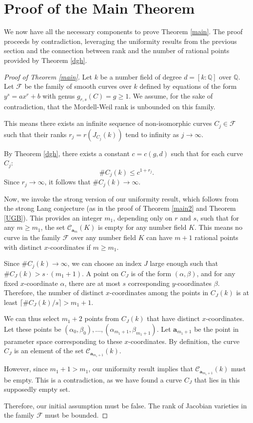 \documentclass[11pt, a4paper]{amsart}
\theoremstyle{definition}
\newcommand{\Q}{\mathbb{Q}}
\newcommand{\Cc}{\mathcal{C}}
\newcommand{\ba}{\mathbf{a}}
\begin{document}
\section{Proof of the Main Theorem}
\label{proof-main-thm}
We now have all the necessary components to prove Theorem \ref{main}. The proof proceeds by contradiction, leveraging the uniformity results from the previous section and the connection between rank and the number of rational points provided by Theorem \ref{dgh}.

\begin{proof}[Proof of Theorem \ref{main}]
	Let $k$ be a number field of degree $d=[k:\Q]$ over $\Q$. Let $\mathcal{F}$ be the family of smooth curves over $k$ defined by equations of the form $y^s=ax^r+b$ with genus $g_{r,s}(C) = g \geq 1$. We assume, for the sake of contradiction, that the Mordell-Weil rank is unbounded on this family.
	
	This means there exists an infinite sequence of non-isomorphic curves $C_j \in \mathcal{F}$ such that their ranks $r_j = r(J_{C_j}(k))$ tend to infinity as $j \to \infty$.
	
	By Theorem \ref{dgh}, there exists a constant $c = c(g, d)$ such that for each curve $C_j$:
	\[ \#C_j(k) \leq c^{1+r_j}. \]
	Since $r_j \to \infty$, it follows that $\#C_j(k) \to \infty$.
	
	Now, we invoke the strong version of our uniformity result, which follows from the strong Lang conjecture (as in the proof of Theorem \ref{main2} and Theorem \ref{UGB}). This provides an integer $m_1$, depending only on $r$ and $s$, such that for any $m \geq m_1$, the set $\Cc_{\ba_m}(K)$ is empty for any number field $K$. This means no curve in the family $\mathcal{F}$ over any number field $K$ can have $m+1$ rational points with distinct $x$-coordinates if $m \geq m_1$.
	
	Since $\#C_j(k) \to \infty$, we can choose an index $J$ large enough such that $\#C_J(k) > s \cdot (m_1+1)$. A point on $C_J$ is of the form $(\alpha, \beta)$, and for any fixed $x$-coordinate $\alpha$, there are at most $s$ corresponding $y$-coordinates $\beta$. Therefore, the number of distinct $x$-coordinates among the points in $C_J(k)$ is at least $\lceil \#C_J(k)/s \rceil > m_1+1$.
	
	We can thus select $m_1+2$ points from $C_J(k)$ that have distinct $x$-coordinates. Let these points be $(\alpha_0, \beta_0), \dots, (\alpha_{m_1+1}, \beta_{m_1+1})$. Let $\ba_{m_1+1}$ be the point in parameter space corresponding to these $x$-coordinates. By definition, the curve $C_J$ is an element of the set $\Cc_{\ba_{m_1+1}}(k)$.
	
	However, since $m_1+1 > m_1$, our uniformity result implies that $\Cc_{\ba_{m_1+1}}(k)$ must be empty. This is a contradiction, as we have found a curve $C_J$ that lies in this supposedly empty set.
	
	Therefore, our initial assumption must be false. The rank of Jacobian varieties in the family $\mathcal{F}$ must be bounded.
\end{proof}
\end{document}
